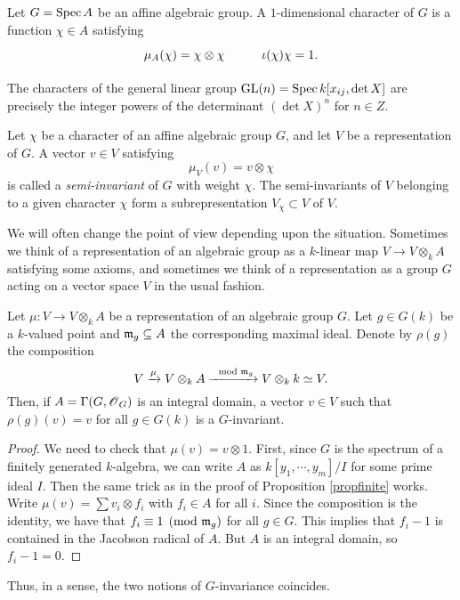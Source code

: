 \documentclass[11pt, english]{article}
\begin{document}
\begin{defi}
Let $G=\operatorname{Spec} A$ be an affine algebraic group. A $1$-dimensional character of $G$ is a function $\chi \in A$ satisfying
\[
\xymatrix{
\mu_A(\chi) = \chi \otimes \chi & \iota(\chi)\chi = 1.
}
\]
\end{defi}

\begin{lemma}
The characters of the general linear group $\operatorname{GL}(n) = \operatorname{Spec} k[x_{ij}, \det X]$ are precisely the integer powers of the determinant $(\det X)^n$ for $n \in Z$.   
\end{lemma}

\begin{defi}
  Let $\chi$ be a character of an affine algebraic group $G$, and let $V$ be a representation of $G$. A vector $v \in V$ satisfying $$\mu_V(v) = v \otimes \chi$$ is called a \emph{semi-invariant} of $G$ with weight $\chi$. The semi-invariants of $V$ belonging to a given character $\chi$ form a subrepresentation $V_\chi \subset V$ of $V$.
\end{defi}

We will often change the point of view depending upon the situation. Sometimes we think of a representation of an algebraic group as a $k$-linear map $V \to V \otimes_k A$ satisfying some axioms, and sometimes we think of a representation as a group $G$ acting on a vector space $V$ in the usual fashion.

\begin{prop}
 Let $\mu: V \to V \otimes_k A$ be a representation of an algebraic group $G$. Let $g \in G(k)$ be a $k$-valued point and $\mathfrak{m}_g \subseteq A$ the corresponding maximal ideal. Denote by $\rho(g)$ the composition
\[
V \xrightarrow{\mu} V \otimes_k A \xrightarrow {\mod {\mathfrak{m}}_g} V \otimes_k k \simeq V.
\]
Then, if $A=\Gamma(G,\operatorname{\mathscr{O}}_G)$ is an integral domain, a vector $v \in V$ such that $\rho(g)(v)=v$ for all $g \in G(k)$ is a $G$-invariant.
\end{prop}
\begin{proof}
We need to check that $\mu(v)=v \otimes 1$.  First, since $G$ is the spectrum of a finitely generated $k$-algebra, we can write $A$ as $k[y_1,\cdots,y_m]/I$ for some prime ideal $I$. Then the same trick as in the proof of Proposition \ref{propfinite} works. Write $\mu(v)=\sum v_i \otimes f_i$ with $f_i \in A$ for all $i$. Since the composition is the identity, we have that $f_i \equiv 1 \pmod{\mathfrak{m}_g}$ for all $g \in G$. This implies that $f_i-1$ is contained in the Jacobson radical of $A$. But $A$ is an integral domain, so $f_i-1=0$.
\end{proof}
Thus, in a sense, the two notions of $G$-invariance coincides.
\end{document}
